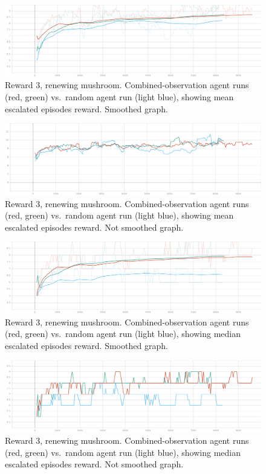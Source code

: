 \documentclass[]{article}
\begin{document}
\begin{figure}
\centering
\includegraphics{./img/114086864-784fdd80-98b3-11eb-9080-b71419e86321.png}
\caption{Reward 3, renewing mushroom. Combined-observation agent runs
(red, green) vs.~random agent run (light blue), showing mean escalated
episodes reward. Smoothed graph.}
\end{figure}

\begin{figure}
\centering
\includegraphics{./img/114087064-b220e400-98b3-11eb-8ef1-881c796127f4.png}
\caption{Reward 3, renewing mushroom. Combined-observation agent runs
(red, green) vs.~random agent run (light blue), showing mean escalated
episodes reward. Not smoothed graph.}
\end{figure}

\begin{figure}
\centering
\includegraphics{./img/114091488-0da1a080-98b9-11eb-9123-f7a314085a8b.png}
\caption{Reward 3, renewing mushroom. Combined-observation agent runs
(red, green) vs.~random agent run (light blue), showing median escalated
episodes reward. Smoothed graph.}
\end{figure}

\begin{figure}
\centering
\includegraphics{./img/114091547-1eeaad00-98b9-11eb-94cf-fcbcccb5a9df.png}
\caption{Reward 3, renewing mushroom. Combined-observation agent runs
(red, green) vs.~random agent run (light blue), showing median escalated
episodes reward. Not smoothed graph.}
\end{figure}
\end{document}
